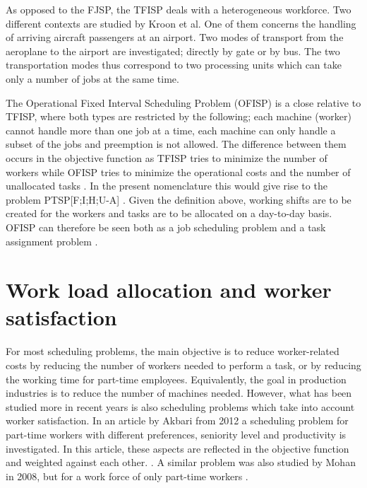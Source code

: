 As opposed to the FJSP, the TFISP deals with a heterogeneous workforce. Two different contexts are studied by Kroon et al. One of them concerns the handling of arriving aircraft passengers at an airport. Two modes of transport from the aeroplane to the airport are investigated; directly by gate or by bus. The two transportation modes thus correspond to two processing units which can take only a number of jobs at the same time.

The Operational Fixed Interval Scheduling Problem (OFISP) is a close relative to TFISP, where both types are restricted by the following; each machine (worker) cannot handle more than one job at a time, each machine can only handle a subset of the jobs and preemption is not allowed. The difference between them occurs in the objective function as TFISP tries to minimize the number of workers while OFISP tries to minimize the operational costs and the number of unallocated tasks \cite{kroon_1993}. In the present nomenclature this would give rise to the problem PTSP[F;I;H;U-A] \cite{krishnamoorthy_2001}. Given the definition above, working shifts are to be created for the workers and tasks are to be allocated on a day-to-day basis. OFISP can therefore be seen both as a job scheduling problem and a task assignment problem \cite{kroon_1993}.



%

\section{Work load allocation and worker satisfaction} \label{WLA}
For most scheduling problems, the main objective is to reduce worker-related costs by reducing the number of workers needed to perform a task, or by reducing the working time for part-time employees. Equivalently, the goal in production industries is to reduce the number of machines needed. However, what has been studied more in recent years is also scheduling problems which take into account worker satisfaction. In an article by Akbari from 2012 a scheduling problem for part-time workers with different preferences, seniority level and productivity is investigated. In this article, these aspects are reflected in the objective function and weighted against each other. \cite{akbari_2012}. A similar problem was also studied by Mohan in 2008, but for a work force of only part-time workers \cite{mohan_2008}.

